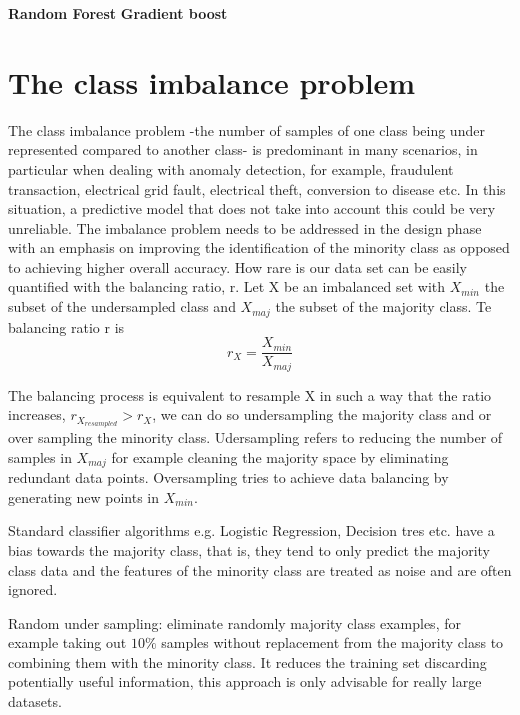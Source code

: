 \documentclass[11pt]{article}
\begin{document}
\textbf{Random Forest}
\textbf{Gradient boost}





\section{The class imbalance problem}
The class imbalance problem -the number of samples of one class being under represented compared to another class- is predominant in many scenarios, in particular when dealing with anomaly detection, for example, fraudulent transaction, electrical grid fault, electrical theft, conversion to disease  etc. In this situation, a predictive model that does not take into account this could be very unreliable.
The imbalance problem needs to be addressed in the design phase with an emphasis on improving the identification of the minority class as opposed to achieving higher overall accuracy.
How rare is our data set can be easily quantified with the balancing ratio, r. Let X be an imbalanced set with $X_{min}$ the subset of the undersampled class and $X_{maj}$ the subset of the majority class. Te balancing ratio r is
\begin{equation}
r_X = \frac{X_{min}}{X_{maj}}
\end{equation}

The balancing process is equivalent to resample X in such a way that the ratio increases, $r_{X_{resampled}} > r_X$, we can do so undersampling the majority class and or over sampling the minority class. Udersampling refers to reducing the number of samples in $X_{maj}$ for example cleaning the majority space by eliminating redundant data points. Oversampling tries to achieve data balancing by generating new points in $X_{min}$.

Standard classifier algorithms e.g. Logistic Regression, Decision tres etc. have a bias towards the majority class, that is, they tend to only predict the majority class data and the features of the minority class are treated as noise and are often ignored. 


Random under sampling: eliminate randomly majority class examples, for example taking out $10\%$ samples without replacement from the majority class to combining them with the minority class. It reduces the training set discarding potentially useful information, this approach is only advisable for really large datasets.
\end{document}
